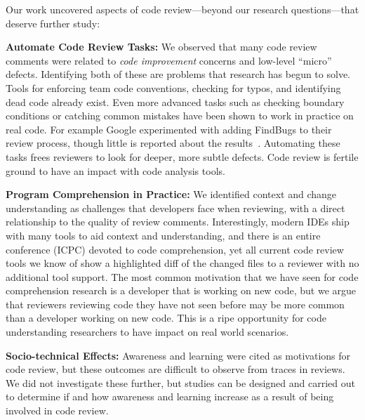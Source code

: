 Our work uncovered aspects of code review---beyond our research questions---that deserve further study:

\textbf{Automate Code Review Tasks:} We observed that many code review comments were related to \emph{code improvement} concerns and low-level ``micro'' defects. Identifying both of these are problems that research has begun to solve. Tools for enforcing team code conventions, checking for typos, and identifying dead code already exist. Even more advanced tasks such as checking boundary conditions or catching common mistakes have been shown to work in practice on real code. For example Google experimented with adding FindBugs to their review process, though little is reported about the results~\cite{ayewah2007using}. Automating these tasks frees reviewers to look for deeper, more subtle defects. Code review is fertile ground to have an impact with code analysis tools.

\textbf{Program Comprehension in Practice:} We identified context and change understanding as challenges that developers face when reviewing, with a direct relationship to the quality of review comments. Interestingly, modern IDEs ship with many tools to aid context and understanding, and there is an entire conference (ICPC) devoted to code comprehension, yet all current code review tools we know of show a highlighted diff of the changed files to a reviewer with no additional tool support. The most common motivation that we have seen for code comprehension research is a developer that is working on new code, but we argue that reviewers reviewing code they have not seen before may be more common than a developer working on new code. This is a ripe opportunity for code understanding researchers to have impact on real world scenarios.

\textbf{Socio-technical Effects:} Awareness and learning were cited as motivations for code review, but these outcomes are difficult to observe from traces in reviews. We did not investigate these further, but studies can be designed and carried out to determine if and how awareness and learning increase as a result of being involved in code review.

